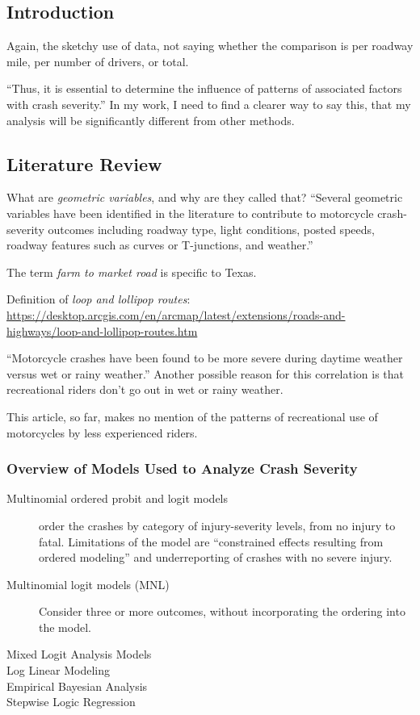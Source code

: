 \documentclass[11pt]{article}
\begin{document}
\begin{spacing}{1.2}
\subsection{Introduction}

Again, the sketchy use of data, not saying whether the comparison is per roadway mile, per number of drivers, or total.  

``Thus, it is essential to determine the influence of patterns of associated factors with crash severity.''  In my work, I need to find a clearer way to say this, that my analysis will be significantly different from other methods.  

\subsection{Literature Review}

What are {\it geometric variables}, and why are they called that?  ``Several geometric variables have been identified in the
literature to contribute to motorcycle crash-severity outcomes
including roadway type, light conditions, posted
speeds, roadway features such as curves or T-junctions,
and weather.''

The term {\it farm to market road} is specific to Texas.  

Definition of {\it loop and lollipop routes}:  \url{https://desktop.arcgis.com/en/arcmap/latest/extensions/roads-and-highways/loop-and-lollipop-routes.htm}

``Motorcycle crashes have been found to be more severe
during daytime weather versus wet or rainy weather.''  Another possible reason for this correlation is that recreational riders don't go out in wet or rainy weather.  

This article, so far, makes no mention of the patterns of recreational use of motorcycles by less experienced riders.  

\subsubsection{Overview of Models Used to Analyze Crash Severity}

\begin{description}
	\item [Multinomial ordered probit
and logit models] order the crashes by category of injury-severity levels, from no injury to fatal.  Limitations of the model are ``constrained effects resulting from ordered modeling'' and underreporting of crashes with no severe injury.  
	\item [Multinomial logit models (MNL)]  Consider three or more outcomes, without incorporating the ordering into the model.
	\item [Mixed Logit Analysis Models]
	\item [Log Linear Modeling]
	\item [Empirical Bayesian Analysis]
	\item [Stepwise Logic Regression]
\end{description}


\end{spacing}
\end{document}
